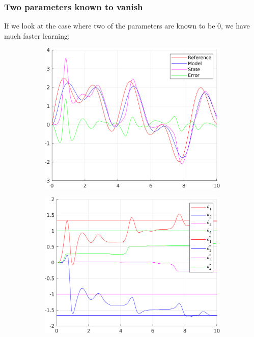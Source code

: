 \documentclass[12pt,a4paper]{article}
\begin{document}
	\subsubsection*{Two parameters known to vanish}
	If we look at the case where two of the parameters are known to be $0$, we have much faster learning:
	
	\begin{figure}[H]
		\centering
		\begin{subfigure}{.45\textwidth}
			\centering
			\includegraphics[width=1\textwidth]{Graphics/NonLinearStateZero1.png}
		\end{subfigure}%
		\begin{subfigure}{.45\textwidth}
			\centering
			\includegraphics[width=1\textwidth]{Graphics/NonLinearParametersZero1.png}

\end{subfigure}
\end{figure}
\end{document}
